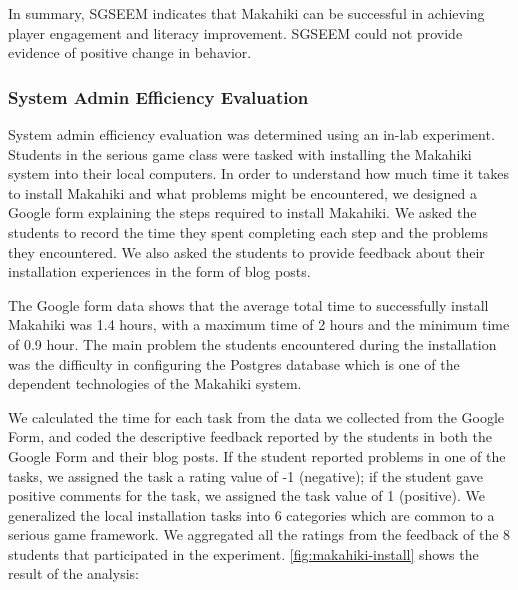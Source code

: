 \documentclass{sigchi}
\begin{document}
In summary, SGSEEM indicates that Makahiki can be successful in achieving
player engagement and literacy improvement. SGSEEM could not provide evidence of positive change in
behavior. 


\subsubsection{System Admin Efficiency Evaluation}

System admin efficiency evaluation was determined using an in-lab experiment.  Students in
the serious game class were tasked with installing the Makahiki system into their local
computers. In order to understand how much time it takes to install Makahiki and what
problems might be encountered, we designed a Google form explaining the steps required to
install Makahiki. We asked the students to record the time they spent completing each step
and the problems they encountered. We also asked the students to provide feedback about
their installation experiences in the form of blog posts.

The Google form data shows that the average total time to successfully install Makahiki
was 1.4 hours, with a maximum time of 2 hours and the minimum time of 0.9 hour. The main
problem the students encountered during the installation was the difficulty in configuring
the Postgres database which is one of the dependent technologies of the Makahiki system.

We calculated the time for each task from the data we collected from the Google
Form, and coded the descriptive feedback reported by the students in both the Google Form and
 their blog posts. If the student reported problems in one of the tasks, we assigned the task
  a rating value of -1 (negative); if the student gave positive comments for the task, we
  assigned the task value of 1 (positive). We generalized the local installation tasks into 6
  categories which are common to a serious game framework. We aggregated all the ratings from
  the feedback of the 8 students that participated in the experiment.
  \autoref{fig:makahiki-install} shows the result of the analysis:
\end{document}
